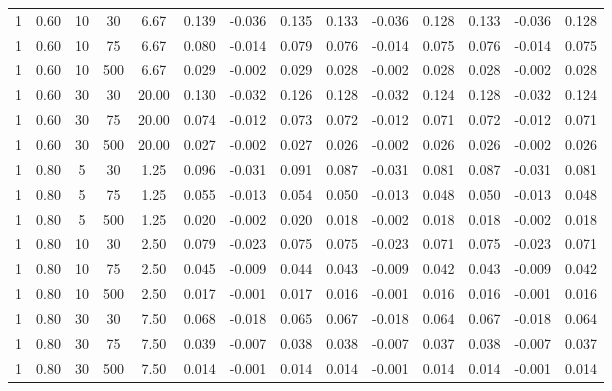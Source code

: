 \documentclass[12pt,epsfig]{article}
\begin{document}
\begin{table} [h]
{\begin{tabular}{| c | c | c | c | c || c | c | c || c | c | c || c | c | c |}
    1 & 0.60 &  10 &  30 & 6.67 & 0.139 & -0.036 & 0.135 & 0.133 & -0.036 & 0.128 & 0.133 & -0.036 & 0.128 \\ 
    1 & 0.60 &  10 &  75 & 6.67 & 0.080 & -0.014 & 0.079 & 0.076 & -0.014 & 0.075 & 0.076 & -0.014 & 0.075 \\ 
    1 & 0.60 &  10 & 500 & 6.67 & 0.029 & -0.002 & 0.029 & 0.028 & -0.002 & 0.028 & 0.028 & -0.002 & 0.028 \\ 
    1 & 0.60 &  30 &  30 & 20.00 & 0.130 & -0.032 & 0.126 & 0.128 & -0.032 & 0.124 & 0.128 & -0.032 & 0.124 \\ 
    1 & 0.60 &  30 &  75 & 20.00 & 0.074 & -0.012 & 0.073 & 0.072 & -0.012 & 0.071 & 0.072 & -0.012 & 0.071 \\ 
    1 & 0.60 &  30 & 500 & 20.00 & 0.027 & -0.002 & 0.027 & 0.026 & -0.002 & 0.026 & 0.026 & -0.002 & 0.026 \\ 
    1 & 0.80 &   5 &  30 & 1.25 & 0.096 & -0.031 & 0.091 & 0.087 & -0.031 & 0.081 & 0.087 & -0.031 & 0.081 \\ 
    1 & 0.80 &   5 &  75 & 1.25 & 0.055 & -0.013 & 0.054 & 0.050 & -0.013 & 0.048 & 0.050 & -0.013 & 0.048 \\ 
    1 & 0.80 &   5 & 500 & 1.25 & 0.020 & -0.002 & 0.020 & 0.018 & -0.002 & 0.018 & 0.018 & -0.002 & 0.018 \\ 
    1 & 0.80 &  10 &  30 & 2.50 & 0.079 & -0.023 & 0.075 & 0.075 & -0.023 & 0.071 & 0.075 & -0.023 & 0.071 \\ 
    1 & 0.80 &  10 &  75 & 2.50 & 0.045 & -0.009 & 0.044 & 0.043 & -0.009 & 0.042 & 0.043 & -0.009 & 0.042 \\ 
    1 & 0.80 &  10 & 500 & 2.50 & 0.017 & -0.001 & 0.017 & 0.016 & -0.001 & 0.016 & 0.016 & -0.001 & 0.016 \\ 
    1 & 0.80 &  30 &  30 & 7.50 & 0.068 & -0.018 & 0.065 & 0.067 & -0.018 & 0.064 & 0.067 & -0.018 & 0.064 \\ 
    1 & 0.80 &  30 &  75 & 7.50 & 0.039 & -0.007 & 0.038 & 0.038 & -0.007 & 0.037 & 0.038 & -0.007 & 0.037 \\ 
    1 & 0.80 &  30 & 500 & 7.50 & 0.014 & -0.001 & 0.014 & 0.014 & -0.001 & 0.014 & 0.014 & -0.001 & 0.014 \\ 
   \hline \hline
    \end{tabular}
}


\end{table}
\end{document}
